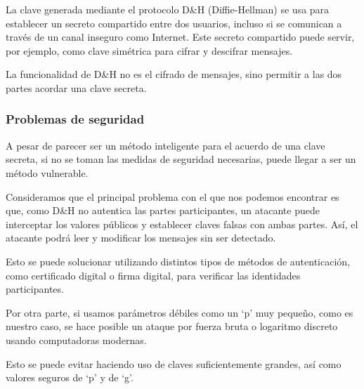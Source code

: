 La clave generada mediante el protocolo D\&H (Diffie-Hellman) se usa para establecer un secreto compartido entre dos usuarios, incluso si se comunican a través de un canal inseguro como Internet. Este secreto compartido puede servir, por ejemplo, como clave simétrica para cifrar y descifrar mensajes. 

La funcionalidad de D\&H no es el cifrado de mensajes, sino permitir a las dos partes acordar una clave secreta. 


\subsubsection{Problemas de seguridad}

A pesar de parecer ser un método inteligente para el acuerdo de una clave secreta, si no se toman las medidas de seguridad necesarias, puede llegar a ser un método vulnerable.  

Consideramos que el principal problema con el que nos podemos encontrar es que, como D\&H no autentica las partes participantes, un atacante puede interceptar los valores públicos y establecer claves falsas con ambas partes. Así, el atacante podrá leer y modificar los mensajes sin ser detectado. 

Esto se puede solucionar utilizando distintos tipos de métodos de autenticación, como certificado digital o firma digital, para verificar las identidades participantes. 

Por otra parte, si usamos parámetros débiles como un ‘p’ muy pequeño, como es nuestro caso, se hace posible un ataque por fuerza bruta o logaritmo discreto usando computadoras modernas. 

Esto se puede evitar haciendo uso de claves suficientemente grandes, así como valores seguros de ‘p’ y de ‘g’. 
